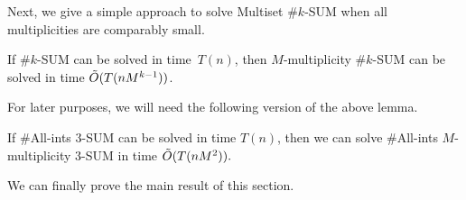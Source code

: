 Next, we give a simple approach to solve Multiset $\# k$-SUM when all multiplicities are comparably small.

\begin{lemma}
  If $\#k$-SUM can be solved in time~$T(n)$, then $M$-multiplicity $\#k$-SUM can be solved in time $\Tilde{O}(T(nM^{k-1}))$.
\label{reduction_t}
\end{lemma}

For later purposes, we will need the following version of the above lemma.
\begin{observation}
If $\#$All-ints $3$-SUM can be solved in time $T(n)$,
then we can solve $\#$All-ints $M$-multiplicity $3$-SUM in time $\Tilde{O}(T(nM^{2})).$
\label{All-ints-count}
\end{observation}

We can finally prove the main result of this section. 

